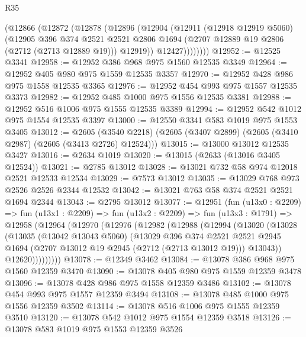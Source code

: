 \begin{lexlean}{R35}
\begin{coremodule}
          (@12866
            (@12872
              (@12878
                (@12896
                  (@12904
                    (@12911
                      (@12918 @12919 @5060)
                      (@12905
                        @396
                        @374
                        @2521
                        @2521
                        @2806
                        @1694
                        (@2707 @12889 @19 @2806 (@2712 (@2713 @12889 @19)))
                        @12919))
                    @12427))))))))
@12952 := @12525 @3341
@12958 := @12952 @386 @968 @975 @1560 @12535 @3349
@12964 := @12952 @405 @980 @975 @1559 @12535 @3357
@12970 := @12952 @428 @986 @975 @1558 @12535 @3365
@12976 := @12952 @454 @993 @975 @1557 @12535 @3373
@12982 := @12952 @485 @1000 @975 @1556 @12535 @3381
@12988 := @12952 @516 @1006 @975 @1555 @12535 @3389
@12994 := @12952 @542 @1012 @975 @1554 @12535 @3397
@13000 := @12550 @3341 @583 @1019 @975 @1553 @3405
@13012 := @2605
    (@3540 @2218)
    (@2605 (@3407 @2899) (@2605 (@3410 @2987) (@2605 (@3413 @2726) @12524)))
@13015 := @13000 @13012 @12535 @3427
@13016 := @2634 @1019
@13020 := @13015 (@2633 (@13016 @3405 @12524))
@13021 := @2785 @13012
@13028 := @13021 @732 @58 @974 @12018 @2521 @12533 @12534
@13029 := @7573 @13012
@13035 := @13029 @768 @973 @2526 @2526 @2344 @12532
@13042 := @13021 @763 @58 @374 @2521 @2521 @1694 @2344
@13043 := @2795 @13012
@13077 := @12951
    (fun (u13x0 : @2209) =>
    fun (u13x1 : @2209) =>
    fun (u13x2 : @2209) =>
    fun (u13x3 : @1791) =>
    @12958
      (@12964
        (@12970
          (@12976
            (@12982
              (@12988
                (@12994
                  (@13020
                    (@13028
                      (@13035
                        (@13042 @13043 @5060)
                        (@13029
                          @396
                          @374
                          @2521
                          @2521
                          @2945
                          @1694
                          (@2707 @13012 @19 @2945 (@2712 (@2713 @13012 @19)))
                          @13043))
                      @12620)))))))))
@13078 := @12349 @3462
@13084 := @13078 @386 @968 @975 @1560 @12359 @3470
@13090 := @13078 @405 @980 @975 @1559 @12359 @3478
@13096 := @13078 @428 @986 @975 @1558 @12359 @3486
@13102 := @13078 @454 @993 @975 @1557 @12359 @3494
@13108 := @13078 @485 @1000 @975 @1556 @12359 @3502
@13114 := @13078 @516 @1006 @975 @1555 @12359 @3510
@13120 := @13078 @542 @1012 @975 @1554 @12359 @3518
@13126 := @13078 @583 @1019 @975 @1553 @12359 @3526

\end{coremodule}
\end{lexlean}
